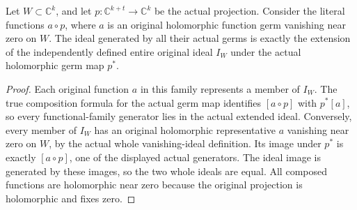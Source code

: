 \begin{lemma}
\label{hir:actual-cylinder-pullback-functional-family-span}
\leanok
Let $W\subset\mathbb C^k$, and let $p:\mathbb C^{k+t}\to\mathbb C^k$
be the actual projection. Consider the literal functions $a\circ p$,
where $a$ is an original holomorphic function germ vanishing near zero
on $W$. The ideal generated by all their actual germs is exactly the
extension of the independently defined entire original ideal $I_W$
under the actual holomorphic germ map $p^*$.
\end{lemma}
\begin{proof}
Each original function $a$ in this family represents a member of $I_W$.
The true composition formula for the actual germ map identifies
$[a\circ p]$ with $p^*[a]$, so every functional-family generator lies
in the actual extended ideal. Conversely, every member of $I_W$ has
an original holomorphic representative $a$ vanishing near zero on $W$,
by the actual whole vanishing-ideal definition. Its image under $p^*$
is exactly $[a\circ p]$, one of the displayed actual generators.
The ideal image is generated by these images, so the two whole ideals
are equal. All composed functions are holomorphic near zero because
the original projection is holomorphic and fixes zero.
\end{proof}

